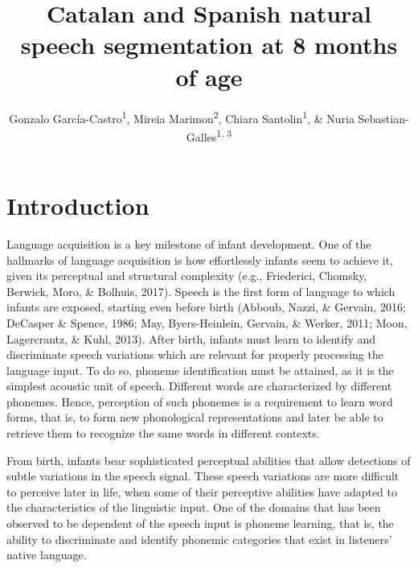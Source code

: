 \documentclass[man,floatsintext]{apa6}
\title{Catalan and Spanish natural speech segmentation at 8 months of age}
\author{Gonzalo García-Castro\textsuperscript{1}, Mireia Marimon\textsuperscript{2}, Chiara Santolin\textsuperscript{1}, \& Nuria Sebastian-Galles\textsuperscript{1, 3}}
\date{}
\affiliation{
\vspace{0.5cm}
\textsuperscript{1} Center for Brain and Cognition, Pompeu Fabra University\\\textsuperscript{2} Department of Linguistics, University of Potsdam\\\textsuperscript{3} Department of Information and Communications Technologies, Pompeu Fabra University}
\begin{document}
\maketitle

\hypertarget{introduction}{%
\section{Introduction}\label{introduction}}

Language acquisition is a key milestone of infant development. One of the hallmarks of language acquisition is how effortlessly infants seem to achieve it, given its perceptual and structural complexity (e.g., Friederici, Chomsky, Berwick, Moro, \& Bolhuis, 2017). Speech is the first form of language to which infants are exposed, starting even before birth (Abboub, Nazzi, \& Gervain, 2016; DeCasper \& Spence, 1986; May, Byers-Heinlein, Gervain, \& Werker, 2011; Moon, Lagercrantz, \& Kuhl, 2013). After birth, infants must learn to identify and discriminate speech variations which are relevant for properly processing the language input. To do so, phoneme identification must be attained, as it is the simplest acoustic unit of speech. Different words are characterized by different phonemes. Hence, perception of such phonemes is a requirement to learn word forms, that is, to form new phonological representations and later be able to retrieve them to recognize the same words in different contexts.

From birth, infants bear sophisticated perceptual abilities that allow detections of subtle variations in the speech signal. These speech variations are more difficult to perceive later in life, when some of their perceptive abilities have adapted to the characteristics of the linguistic input. One of the domains that has been observed to be dependent of the speech input is phoneme learning, that is, the ability to discriminate and identify phonemic categories that exist in listeners' native language.
\end{document}
